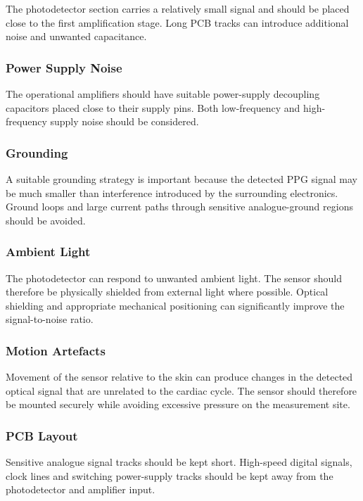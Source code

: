 \documentclass[10pt]{article}
\begin{document}
The photodetector section carries a relatively small signal and should be placed close to the first amplification stage. Long PCB tracks can introduce additional noise and unwanted capacitance.

\subsubsection{Power Supply Noise}

The operational amplifiers should have suitable power-supply decoupling capacitors placed close to their supply pins. Both low-frequency and high-frequency supply noise should be considered.

\subsubsection{Grounding}

A suitable grounding strategy is important because the detected PPG signal may be much smaller than interference introduced by the surrounding electronics. Ground loops and large current paths through sensitive analogue-ground regions should be avoided.

\subsubsection{Ambient Light}

The photodetector can respond to unwanted ambient light. The sensor should therefore be physically shielded from external light where possible. Optical shielding and appropriate mechanical positioning can significantly improve the signal-to-noise ratio.

\subsubsection{Motion Artefacts}

Movement of the sensor relative to the skin can produce changes in the detected optical signal that are unrelated to the cardiac cycle. The sensor should therefore be mounted securely while avoiding excessive pressure on the measurement site.

\subsubsection{PCB Layout}

Sensitive analogue signal tracks should be kept short. High-speed digital signals, clock lines and switching power-supply tracks should be kept away from the photodetector and amplifier input.
\end{document}
